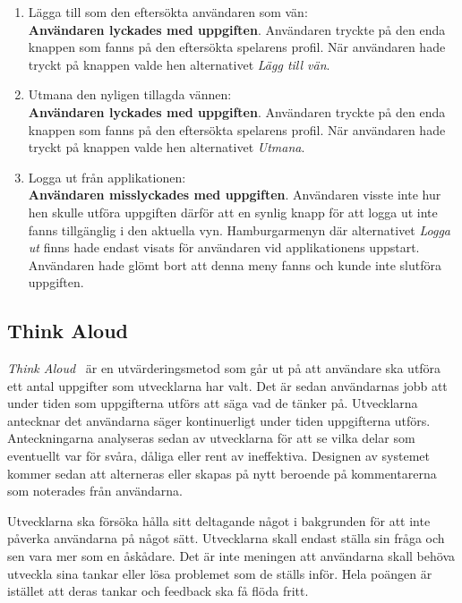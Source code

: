 \documentclass[a4paper, 11pt]{article}
\begin{document}
\begin{enumerate}
\item Lägga till som den eftersökta användaren som vän:\\
\textbf{Användaren lyckades med uppgiften}. Användaren tryckte på den enda knappen som fanns på den eftersökta spelarens profil. När användaren hade tryckt på knappen valde hen alternativet \textit{Lägg till vän}. 

\item Utmana den nyligen tillagda vännen:\\
\textbf{Användaren lyckades med uppgiften}. Användaren tryckte på den enda knappen som fanns på den eftersökta spelarens profil. När användaren hade tryckt på knappen valde hen alternativet \textit{Utmana}.

\item Logga ut från applikationen:\\ 
\textbf{Användaren misslyckades med uppgiften}.
Användaren visste inte hur hen skulle utföra uppgiften därför att en synlig knapp för att logga ut inte fanns tillgänglig i den aktuella vyn. Hamburgarmenyn där alternativet \textit{Logga ut} finns hade endast visats för användaren vid applikationens uppstart. Användaren hade glömt bort att denna meny fanns och kunde inte slutföra uppgiften. 
      
\end{enumerate}

\subsection{Think Aloud}
\textit{Think Aloud}~\cite[sid 29--32]{thinkaloud} är en utvärderingsmetod som går ut på att användare ska utföra ett antal uppgifter som utvecklarna har valt. Det är sedan användarnas jobb att under tiden som uppgifterna utförs att säga vad de tänker på. Utvecklarna antecknar det användarna säger kontinuerligt under tiden uppgifterna utförs. Anteckningarna analyseras sedan av utvecklarna för att se vilka delar som eventuellt var för svåra, dåliga eller rent av ineffektiva. Designen av systemet kommer sedan att alterneras eller skapas på nytt beroende på kommentarerna som noterades från användarna.


Utvecklarna ska försöka hålla sitt deltagande något i bakgrunden för att inte påverka användarna på något sätt. Utvecklarna skall endast ställa sin fråga och sen vara mer som en åskådare. Det är inte meningen att användarna skall behöva utveckla sina tankar eller lösa problemet som de ställs inför. Hela poängen är istället att deras tankar och feedback ska få flöda fritt.
\end{document}

